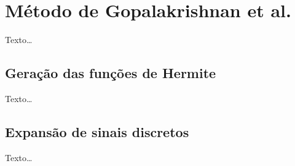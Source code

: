 
\section{Método de Gopalakrishnan et al.}
\label{sec:section4}
Texto\ldots

\subsection{Geração das funções de Hermite}
Texto\ldots

\subsection{Expansão de sinais discretos}
Texto\ldots